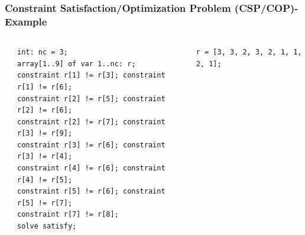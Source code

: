 \documentclass[table,aspectratio=169]{beamer}
\begin{document}
\begin{frame}[fragile]
\frametitle{Constraint Satisfaction/Optimization Problem (CSP/COP)- Example}
\begin{columns}
\begin{center}
\end{center}
\pause
{\scriptsize
\begin{verbatim}
int: nc = 3;
array[1..9] of var 1..nc: r;
constraint r[1] != r[3]; constraint r[1] != r[6];
constraint r[2] != r[5]; constraint r[2] != r[6]; 
constraint r[2] != r[7]; constraint r[3] != r[9]; 
constraint r[3] != r[6]; constraint r[3] != r[4];
constraint r[4] != r[6]; constraint r[4] != r[5];
constraint r[5] != r[6]; constraint r[5] != r[7];
constraint r[7] != r[8];
solve satisfy;
\end{verbatim}}
\pause
\vspace{-0.4cm}
{\scriptsize
\begin{verbatim}
r = [3, 3, 2, 3, 2, 1, 1, 2, 1];
\end{verbatim}}
\end{columns}
\end{frame}
\end{document}
